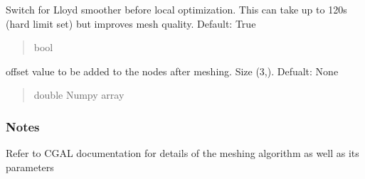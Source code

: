 \documentclass[letterpaper,10pt,english]{sphinxmanual}
\begin{document}
\begin{fulllineitems}
\begin{fulllineitems}
\begin{quote}
\begin{description}
\end{description}\end{quote}

\end{fulllineitems}


\begin{fulllineitems}
\label{\detokenize{_autosummary/nirfasterff.utils.MeshingParams:nirfasterff.utils.MeshingParams.lloyd_smooth}}
\pysigstartsignatures
{}
\pysigstopsignatures
\sphinxAtStartPar
Switch for Lloyd smoother before local optimization. This can take up to 120s (hard limit set) but improves mesh quality. Default: True
\begin{quote}\begin{description}
\sphinxAtStartPar
bool

\end{description}\end{quote}

\end{fulllineitems}


\begin{fulllineitems}
\label{\detokenize{_autosummary/nirfasterff.utils.MeshingParams:nirfasterff.utils.MeshingParams.offset}}
\pysigstartsignatures
{}
\pysigstopsignatures
\sphinxAtStartPar
offset value to be added to the nodes after meshing. Size (3,). Defualt: None
\begin{quote}\begin{description}
\sphinxAtStartPar
double Numpy array

\end{description}\end{quote}

\end{fulllineitems}

\subsubsection*{Notes}

\sphinxAtStartPar
Refer to CGAL documentation for details of the meshing algorithm as well as its parameters


\end{fulllineitems}
\end{document}
